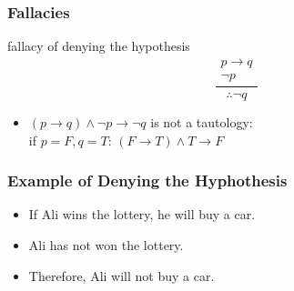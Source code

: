 \documentclass[dvipsnames]{beamer}
\begin{document}
\begin{frame}
  \frametitle{Fallacies}

  \begin{block}{fallacy of denying the hypothesis}
    \[
    \frac
      {
        \begin{array}{c}
          p \rightarrow q\\
          \neg p
        \end{array}
      }
      {
        \therefore \neg q
      }
    \]
  \end{block}

  \pause
  \begin{itemize}
    \item $(p \rightarrow q) \wedge \neg p \rightarrow \neg q$ is not a tautology:\\
      if $p=F,q=T$: $(F \rightarrow T) \wedge T \rightarrow F$
  \end{itemize}
\end{frame}

\begin{frame}
  \frametitle{Example of Denying the Hyphothesis}

  \begin{example}
    \begin{itemize}
      \item If Ali wins the lottery, he will buy a car.
      \item Ali has not won the lottery.

      \pause
      \medskip
      \item Therefore, Ali will not buy a car.
    \end{itemize}
  \end{example}
\end{frame}
\end{document}
